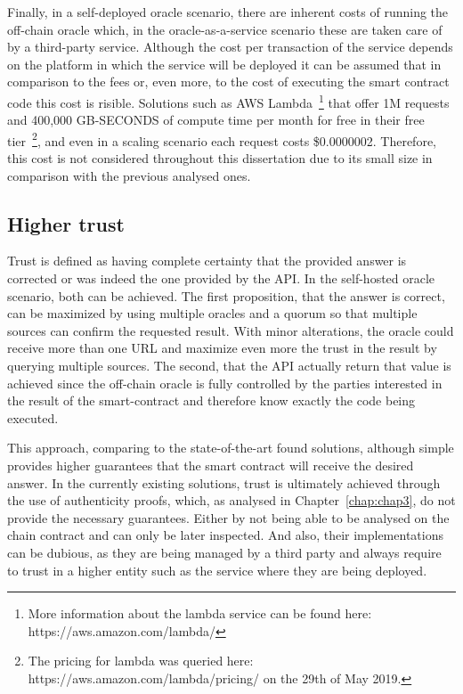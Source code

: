 Finally, in a self-deployed oracle scenario, there are inherent costs of running the off-chain oracle which, in the oracle-as-a-service scenario these are taken care of by a third-party service. Although the cost per transaction of the service depends on the platform in which the service will be deployed it can be assumed that in comparison to the fees or, even more, to the cost of executing the smart contract code this cost is risible. Solutions such as AWS Lambda~\footnote{More information about the lambda service can be found here: https://aws.amazon.com/lambda/} that offer 1M requests and 400,000 GB-SECONDS of compute time per month for free in their free tier~\footnote{The pricing for lambda was queried here: https://aws.amazon.com/lambda/pricing/ on the 29th of May 2019.}, and even in a scaling scenario each request costs \$0.0000002. Therefore, this cost is not considered throughout this dissertation due to its small size in comparison with the previous analysed ones.

\subsection{Higher trust}

Trust is defined as having complete certainty that the provided answer is corrected or was indeed the one provided by the API. In the self-hosted oracle scenario, both can be achieved. The first proposition, that the answer is correct, can be maximized by using multiple oracles and a quorum so that multiple sources can confirm the requested result. With minor alterations, the oracle could receive more than one URL and maximize even more the trust in the result by querying multiple sources. The second, that the API actually return that value is achieved since the off-chain oracle is fully controlled by the parties interested in the result of the smart-contract and therefore know exactly the code being executed.

This approach, comparing to the state-of-the-art found solutions, although simple provides higher guarantees that the smart contract will receive the desired answer. In the currently existing solutions, trust is ultimately achieved through the use of authenticity proofs, which, as analysed in Chapter~\ref{chap:chap3}, do not provide the necessary guarantees. Either by not being able to be analysed on the chain contract and can only be later inspected. And also, their implementations can be dubious, as they are being managed by a third party and always require to trust in a higher entity such as the service where they are being deployed.

